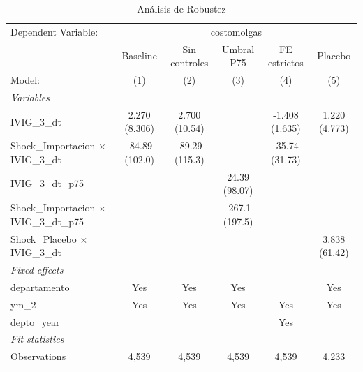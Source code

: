 \documentclass[12pt]{article}
\begin{document}
\setcounter{table}{11}
\begin{table}[htbp]
\centering
\begin{threeparttable}

   \caption{Análisis de Robustez}
   \centering
   \small
   \begin{tabular}{lccccc}
      \tabularnewline \midrule \midrule
      Dependent Variable: & \multicolumn{5}{c}{costomolgas}\\
                                                        & Baseline       & Sin controles  & Umbral P75     & FE estrictos   & Placebo \\   
      Model:                                            & (1)            & (2)            & (3)            & (4)            & (5)\\  
      \midrule
      \emph{Variables}\\
      IVIG\_3\_dt                                       & 2.270 (8.306)  & 2.700 (10.54)  &                & -1.408 (1.635) & 1.220 (4.773)\\   
      Shock\_Importacion $\times$ IVIG\_3\_dt           & -84.89 (102.0) & -89.29 (115.3) &                & -35.74 (31.73) &   \\   
      IVIG\_3\_dt\_p75                                  &                &                & 24.39 (98.07)  &                &   \\   
      Shock\_Importacion $\times$ IVIG\_3\_dt\_p75      &                &                & -267.1 (197.5) &                &   \\   
      Shock\_Placebo $\times$ IVIG\_3\_dt               &                &                &                &                & 3.838 (61.42)\\   
      \midrule
      \emph{Fixed-effects}\\
      departamento                                      & Yes            & Yes            & Yes            &                & Yes\\  
      ym\_2                                             & Yes            & Yes            & Yes            & Yes            & Yes\\  
      depto\_year                                       &                &                &                & Yes            & \\  
      \midrule
      \emph{Fit statistics}\\
      Observations                                      & 4,539          & 4,539          & 4,539          & 4,539          & 4,233\\  

\end{tabular}
\end{threeparttable}
\end{table}
\end{document}
